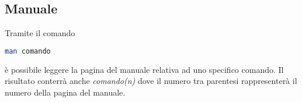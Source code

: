 \subsection{Manuale}
Tramite il comando
\begin{lstlisting}[language=BASH]
	man comando
\end{lstlisting}
è possibile leggere la pagina del manuale relativa ad uno specifico comando. Il risultato conterrà anche \textit{comando(n)} dove il numero tra parentesi rappresenterà il numero della pagina del manuale.